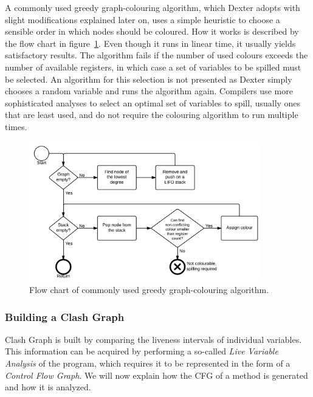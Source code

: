 \documentclass[12pt,twoside,notitlepage]{report}
\begin{document}
A commonly used greedy graph-colouring algorithm, which Dexter adopts with slight modifications explained later on, uses a simple heuristic to choose a sensible order in which nodes should be coloured. How it works is described by the flow chart in figure~\ref{fig:Implementation_GraphColouring}. Even though it runs in linear time, it usually yields satisfactory results. The algorithm fails if the number of used colours exceeds the number of available registers, in which case a set of variables to be spilled must be selected. An algorithm for this selection is not presented as Dexter simply chooses a random variable and runs the algorithm again. Compilers use more sophisticated analyses to select an optimal set of variables to spill, usually ones that are least used, and do not require the colouring algorithm to run multiple times.

\begin{figure}
	\centerline{	
		\includegraphics[width=0.9\textwidth]{figs/fig_implementation_gc.png}
	}
	\caption{Flow chart of commonly used greedy graph-colouring algorithm.}
	\label{fig:Implementation_GraphColouring}
\end{figure}

\subsubsection{Building a Clash Graph}

Clash Graph is built by comparing the liveness intervals of individual variables. This information can be acquired by performing a so-called \emph{Live Variable Analysis} of the program, which requires it to be represented in the form of a \emph{Control Flow Graph}. We will now explain how the CFG of a method is generated and how it is analyzed.
\end{document}
